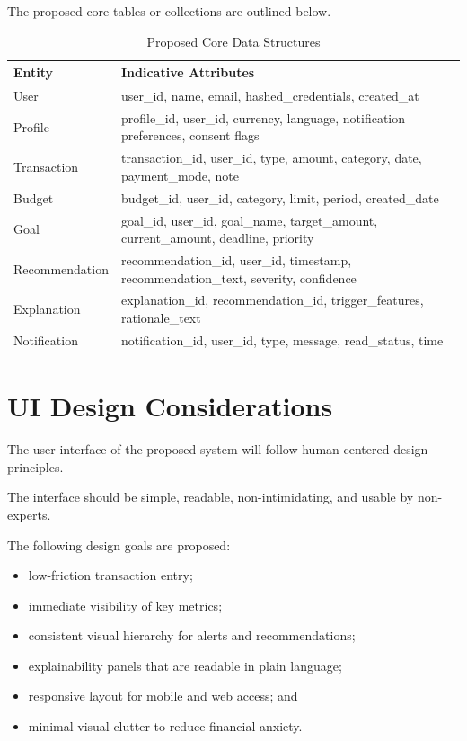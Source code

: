 \documentclass[12pt,a4paper]{report}
\begin{document}
The proposed core tables or collections are outlined below.

\begin{table}[H]
\centering
\caption{Proposed Core Data Structures}
\label{tab:database}
\begin{tabular}{p{4cm}p{9.5cm}}
\toprule
\textbf{Entity} & \textbf{Indicative Attributes} \\
\midrule
User & user\_id,
name,
email,
hashed\_credentials,
created\_at \\
Profile & profile\_id,
user\_id,
currency,
language,
notification preferences,
consent flags \\
Transaction & transaction\_id,
user\_id,
type,
amount,
category,
date,
payment\_mode,
note \\
Budget & budget\_id,
user\_id,
category,
limit,
period,
created\_date \\
Goal & goal\_id,
user\_id,
goal\_name,
target\_amount,
current\_amount,
deadline,
priority \\
Recommendation & recommendation\_id,
user\_id,
timestamp,
recommendation\_text,
severity,
confidence \\
Explanation & explanation\_id,
recommendation\_id,
trigger\_features,
rationale\_text \\
Notification & notification\_id,
user\_id,
type,
message,
read\_status,
time \\
\bottomrule
\end{tabular}
\end{table}

\section{UI Design Considerations}
The user interface of the proposed system will follow human-centered design principles.

The interface should be simple,
readable,
non-intimidating,
and usable by non-experts.

The following design goals are proposed:
\begin{itemize}[leftmargin=2em]
\item low-friction transaction entry;
\item immediate visibility of key metrics;
\item consistent visual hierarchy for alerts and recommendations;
\item explainability panels that are readable in plain language;
\item responsive layout for mobile and web access;
and
\item minimal visual clutter to reduce financial anxiety.
\end{itemize}
\end{document}
